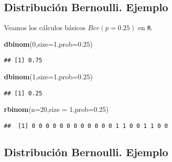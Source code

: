 \documentclass[]{book}
\newenvironment{Shaded}{\begin{snugshade}}{\end{snugshade}}
\newcommand{\DataTypeTok}[1]{\textcolor[rgb]{0.13,0.29,0.53}{#1}}
\newcommand{\DecValTok}[1]{\textcolor[rgb]{0.00,0.00,0.81}{#1}}
\newcommand{\FloatTok}[1]{\textcolor[rgb]{0.00,0.00,0.81}{#1}}
\newcommand{\KeywordTok}[1]{\textcolor[rgb]{0.13,0.29,0.53}{\textbf{#1}}}
\newcommand{\NormalTok}[1]{#1}
\begin{document}
\hypertarget{distribuciuxf3n-bernoulli.-ejemplo}{%
\subsection{Distribución Bernoulli. Ejemplo}\label{distribuciuxf3n-bernoulli.-ejemplo}}

Veamos los cálculos básicos \(Ber(p=0.25)\) en \texttt{R}.

\begin{Shaded}
\begin{Highlighting}[]
\KeywordTok{dbinom}\NormalTok{(}\DecValTok{0}\NormalTok{,}\DataTypeTok{size=}\DecValTok{1}\NormalTok{,}\DataTypeTok{prob=}\FloatTok{0.25}\NormalTok{)}
\end{Highlighting}
\end{Shaded}

\begin{verbatim}
## [1] 0.75
\end{verbatim}

\begin{Shaded}
\begin{Highlighting}[]
\KeywordTok{dbinom}\NormalTok{(}\DecValTok{1}\NormalTok{,}\DataTypeTok{size=}\DecValTok{1}\NormalTok{,}\DataTypeTok{prob=}\FloatTok{0.25}\NormalTok{)}
\end{Highlighting}
\end{Shaded}

\begin{verbatim}
## [1] 0.25
\end{verbatim}

\begin{Shaded}
\begin{Highlighting}[]
\KeywordTok{rbinom}\NormalTok{(}\DataTypeTok{n=}\DecValTok{20}\NormalTok{,}\DataTypeTok{size =} \DecValTok{1}\NormalTok{,}\DataTypeTok{prob=}\FloatTok{0.25}\NormalTok{)}
\end{Highlighting}
\end{Shaded}

\begin{verbatim}
##  [1] 0 0 0 0 0 0 0 0 0 0 0 0 1 1 0 0 1 1 0 0
\end{verbatim}

\hypertarget{distribuciuxf3n-bernoulli.-ejemplo-1}{%
\subsection{Distribución Bernoulli. Ejemplo}\label{distribuciuxf3n-bernoulli.-ejemplo-1}}
\end{document}
